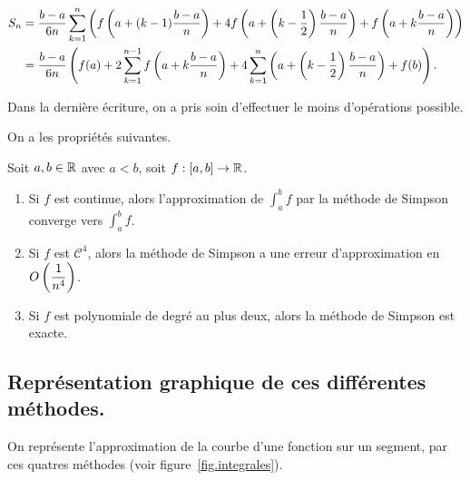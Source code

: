 \begin{align*}
  S_n &= \dfrac{b-a}{6n} \sum_{k=1}^n \left( f\left( a+(k-1)\dfrac{b-a}{n}\right)+ 4f\left( a+\left( k-\dfrac{1}{2}\right)\dfrac{b-a}{n}\right) + f\left( a+k\dfrac{b-a}{n}\right)\right) \\
      &= \dfrac{b-a}{6n} \left(  f(a) + 2 \sum_{k=1}^{n-1}  f\left( a+k\dfrac{b-a}{n}\right) + 4 \sum_{k=1}^{n}  \left( a+\left( k-\dfrac{1}{2}\right)\dfrac{b-a}{n}\right)+  f(b)\right).
\end{align*}

\begin{rem}
  Dans la dernière écriture, on a pris soin d'effectuer le moins d'opérations possible. 
\end{rem}

On a les propriétés suivantes. 

\begin{prop}
  Soit $a,b \in \mathbb{R}$ avec $a<b$, soit $f : [a,b] \to \mathbb{R}$. 
  \begin{enumerate}
    \item Si $f$ est continue, alors l'approximation de $\displaystyle\int_a^b f$ par la méthode de Simpson converge vers $\displaystyle\int_a^b f$. 
    \item Si $f$ est $\mathscr{C}^4$, alors la méthode de Simpson a une erreur d'approximation en $O\left( \dfrac{1}{n^4}\right)$. 
    \item Si $f$ est polynomiale de degré au plus deux, alors la méthode de Simpson est exacte. 
  \end{enumerate}
\end{prop}



\subsection{Représentation graphique de ces différentes méthodes.}
On représente l'approximation de la courbe d'une fonction sur un segment, par ces quatres méthodes (voir figure~\ref{fig.integrales}).

